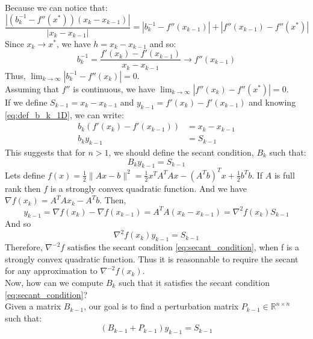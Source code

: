 \documentclass[12pt, openany]{report}
\newcommand{\R}{\mathbb{R}}
\theoremstyle{definition}
\begin{document}
Because we can notice that:
\begin{equation}
	\frac{|(b_k^{-1}-f''(x^*))(x_k-x_{k-1})|}{|x_k-x_{k-1}|} = |b_k^{-1}-f''(x_{k-1})|+|f''(x_{k-1})-f''(x^*)|
\end{equation}
Since $x_k \to x^*$, we have $h=x_k-x_{k-1}$ and so:
\begin{equation}
	b_k^{-1} = \frac{f'(x_k)-f'(x_{k-1})}{x_k-x_{k-1}} \to f''(x_{k-1})
\end{equation}
Thus, $\lim_{k \to \infty} |b_k^{-1} - f''(x_k)| = 0$.\\ Assuming that $f''$ is continuous, we have $\lim_{k \to \infty} |f''(x_k) - f''(x^*)| = 0$.\\
If we define $S_{k-1} = x_k-x_{k-1}$ and $y_{k-1}=f'(x_k)-f'(x_{k-1})$ and knowing \eqref{eq:def_b_k_1D}, we can write:
\begin{equation}
	\begin{aligned}
		b_k (f'(x_k)-f'(x_{k-1})) &= x_k-x_{k-1}\\
		b_k y_{k-1} &= S_{k-1}
	\end{aligned}
\end{equation}
This suggests that for $n > 1$, we should define the secant condition, $B_k$ such that:
\begin{equation}\label{eq:secant_condition}
	B_k y_{k-1} = S_{k-1}
\end{equation}
Lets define $f(x) = \frac{1}{2} \|Ax-b\|^2 = \frac{1}{2} x^TA^TAx - (A^Tb)^Tx + \frac{1}{2} b^Tb$. If $A$ is full rank then $f$ is a strongly convex quadratic function. And we have $\nabla f(x_k) = A^TAx_k-A^Tb$. Then,
\begin{equation}
	y_{k-1} = \nabla f(x_k) - \nabla f(x_{k-1}) = A^TA(x_k-x_{k-1}) = \nabla^2 f(x_{k}) S_{k-1}
\end{equation} 
And so
\begin{equation}
	\nabla^2 f(x_k) y_{k-1} = S_{k-1}
\end{equation}
Therefore, $\nabla^{-2} f$ satisfies the secant condition \eqref{eq:secant_condition}, when f is a strongly convex quadratic function. Thus it is reasonnable to require the secant for any approximation to $\nabla^{-2}f(x_k)$.\\
\newline
Now, how can we compute $B_k$ such that it satisfies the secant condition \eqref{eq:secant_condition}?\\
Given a matrix $B_{k-1}$, our goal is to find a perturbation matrix $P_{k-1} \in \R^{n \times n}$ such that:
\begin{equation}
	\left(B_{k-1} + P_{k-1}\right) y_{k-1} = S_{k-1}
\end{equation}
\end{document}
